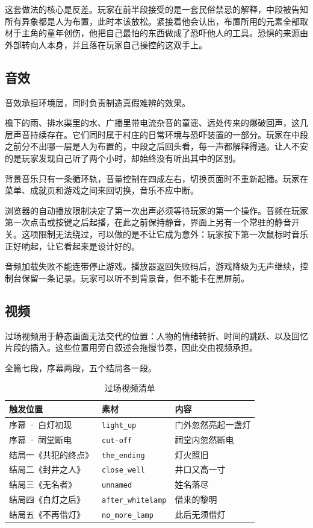 这套做法的核心是反差。玩家在前半段接受的是一套民俗禁忌的解释，中段被告知所有异象都是人为布置，此时本该放松。紧接着他会认出，布置所用的元素全部取材于主角的童年创伤，他把自己最怕的东西做成了恐吓他人的工具。恐惧的来源由外部转向人本身，并且落在玩家自己操控的这双手上。

\subsection{音效}

音效承担环境层，同时负责制造真假难辨的效果。

檐下的雨、排水渠里的水、广播里带电流杂音的童谣、远处传来的爆破回声，这几层声音持续存在。它们同时属于村庄的日常环境与恐吓装置的一部分。玩家在中段之前分不出哪一层是人为布置的，中段之后回头看，每一声都解释得通。让人不安的是玩家发现自己听了两个小时，却始终没有听出其中的区别。

背景音乐只有一条循环轨，音量控制在四成左右，切换页面时不重新起播。玩家在菜单、成就页和游戏之间来回切换，音乐不应中断。

浏览器的自动播放限制决定了第一次出声必须等待玩家的第一个操作。音频在玩家第一次点击或按键之后起播，在此之前保持静音，界面上另有一个常驻的静音开关。这项限制无法绕过，可以做的是不让它成为意外：玩家按下第一次鼠标时音乐正好响起，让它看起来是设计好的。

音频加载失败不能连带停止游戏。播放器返回失败码后，游戏降级为无声继续，控制台保留一条记录。玩家可以听不到背景音，但不能卡在黑屏前。

\subsection{视频}

过场视频用于静态画面无法交代的位置：人物的情绪转折、时间的跳跃、以及回忆片段的插入。这些位置用旁白叙述会拖慢节奏，因此交由视频承担。

全篇七段，序幕两段，五个结局各一段。

\begin{table}[htbp]
\centering
\caption{过场视频清单}
\small
\begin{tabularx}{\linewidth}{@{}l l X@{}}
\toprule
触发位置 & 素材 & 内容 \\
\midrule
序幕 · 白灯初现 & \texttt{light\_up} & 门外忽然亮起一盏灯 \\
序幕 · 祠堂断电 & \texttt{cut-off} & 祠堂内忽然断电 \\
结局一《共犯的终点》 & \texttt{the\_ending} & 灯火照旧 \\
结局二《封井之人》 & \texttt{close\_well} & 井口又高一寸 \\
结局三《无名者》 & \texttt{unnamed} & 姓名落尽 \\
结局四《白灯之后》 & \texttt{after\_whitelamp} & 借来的黎明 \\
结局五《不再借灯》 & \texttt{no\_more\_lamp} & 此后无须借灯 \\
\bottomrule
\end{tabularx}
\end{table}

